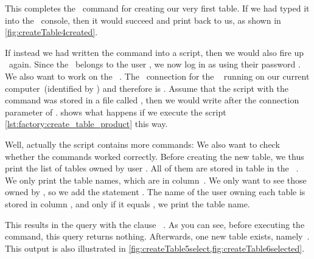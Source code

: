 %
%
%
%
%
This completes the \sql\ command for creating our very first table.
If we had typed it into the \psql\ console, then it would succeed and print  back to us, as shown in \cref{fig:createTable4created}.

If instead we had written the command into a script, then we would also fire up \psql\ again.
Since the \db\ belongs to the user , we now log in as  using their password .
We also want to work on the \db\ .
The \postgresql\ connection  for the \db\  running on our current computer~(identified by \localhost) and therefore is .
Assume that the script with the command was stored in a file called , then we would write  after the connection  parameter of \psql.
 shows what happens if we execute the script \cref{lst:factory:create_table_product} this way.

Well, actually the script contains more commands:
We also want to check whether the commands worked correctly.
Before creating the new table, we thus print the list of tables owned by user .
All of them are stored in table  in the \postgresql\ .
We only print the table names, which are in column~.
We only want to see those owned by , so we add the statement .
The name of the user owning each table is stored in column , and only if it equals , we print the table name.%
%
\begin{sloppypar}%
This results in the query  with the clause ~\cite{PGDG:PD:SC:S}.
As you can see, before executing the  command, this query returns nothing.
Afterwards, one new table exists, namely~.
This output is also illustrated in \cref{fig:createTable5select,fig:createTable6selected}.%
\end{sloppypar}%
\FloatBarrier%
\endhsection%
%
